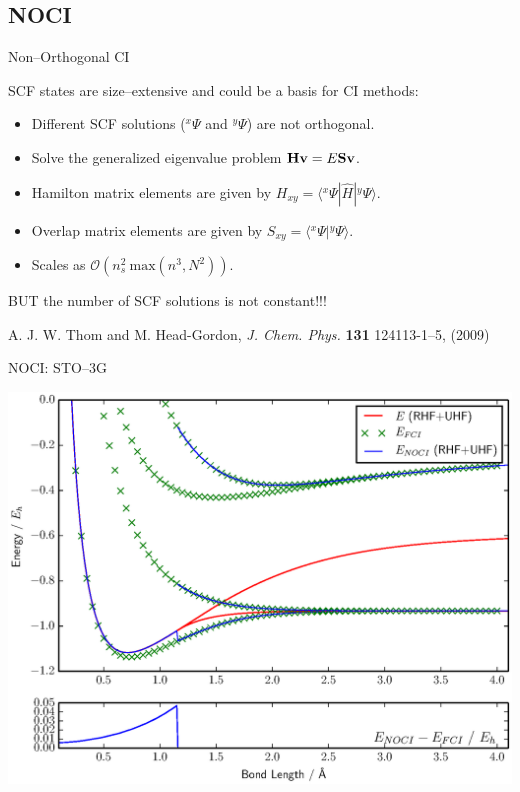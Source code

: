 \documentclass{beamer}
\newcommand{\braket}[3] {{\langle #1 | #2 | #3 \rangle}}
\newcommand{\brket}[2] {{\langle #1 | #2  \rangle}}
\newcommand{\up}[2] {{^{#1}\!#2}}
\begin{document}
\subsection{NOCI}
\begin{frame}{Non--Orthogonal CI}

SCF states are size--extensive and could be a basis for CI methods:
\vspace{1em}
 \begin{itemize}
  \item Different SCF solutions ($\up{x}{\Psi}$ and $\up{y}{\Psi}$) are \alert{not orthogonal}.
  \item Solve the generalized eigenvalue problem ${\bf H v}=E{\bf S v}$.
  \item Hamilton matrix elements are given by $H_{xy}=\braket{\up{x}\Psi}{\hat H}{\up y\Psi}$.
  \item Overlap matrix elements are given by $S_{xy}=\brket{\up{x}\Psi}{\up y\Psi}$.
  \item Scales as $\mathcal{O}\left( n_s^2\ \mathrm{max}\left(n^3, N^2\right) \right).$
 \end{itemize}
 \vspace{0.5em}
   \begin{center} 
BUT the number of SCF solutions is \alert{not constant}!!!
  \end{center}

\vspace{0.5em} 
{\tiny A. J. W. Thom and M. Head-Gordon, {\it J. Chem. Phys.} {\bf 131} 124113-1--5, (2009)}
\end{frame}

\begin{frame}{NOCI:  STO--3G}
\vspace{-1em}
  \begin{center}
  \includegraphics[scale=0.4]{20161219_ThomGroup_Update/H2_normal}
  \end{center}
  \vspace{-1em}
\end{frame}
\end{document}
